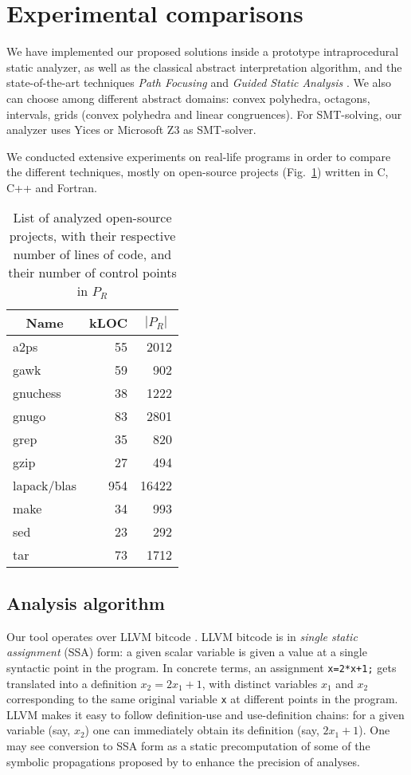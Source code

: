 \documentclass[preprint]{sigplanconf}
\begin{document}
\section{Experimental comparisons}
\label{sec:experiments}

We have implemented our proposed solutions inside a prototype intraprocedural
static analyzer,
as well as the classical abstract interpretation algorithm, and the state-of-the-art
techniques \emph{Path Focusing} \cite{Monniaux_Gonnord_SAS11} and \emph{Guided
Static Analysis} \cite{DBLP:conf/sas/GopanR07}.
We also can choose among different abstract domains: convex polyhedra, octagons,
intervals, grids (convex polyhedra and linear congruences).
For SMT-solving, our analyzer uses Yices
\cite{DBLP:conf/cav/DutertreM06} or Microsoft Z3\cite{DBLP:conf/tacas/MouraB08}
as SMT-solver.

We conducted extensive experiments on real-life programs in order to compare the
different techniques, mostly on open-source projects (Fig.~\ref{fig:projects}) written in C, C++ and Fortran.

\begin{table}[!h]
	\centering
\begin{tabular}{|l|r|r|} \hline
	\multicolumn{1}{|c|}{Name} &
        \multicolumn{1}{c|}{kLOC} &
        \multicolumn{1}{c|}{$|P_R|$} \\ \hline
	a2ps & 55 & 2012\\
	gawk & 59 & 902\\ 
	gnuchess & 38 & 1222\\ 
	gnugo & 83 & 2801\\
	grep & 35 & 820\\
	gzip & 27 & 494\\
	lapack/blas & 954 & 16422\\
	make & 34 & 993\\ 
	sed & 23 & 292\\
	tar & 73 & 1712\\
	\hline
\end{tabular}
\caption{List of analyzed open-source projects, with their respective number of
lines of code, and their number of control points in $P_R$}
\label{fig:projects}
\end{table}

\subsection{Analysis algorithm}
Our tool operates over LLVM bitcode \citep{LLVM_langref,Lattner:2004:LCF:977395.977673}. LLVM bitcode is in \emph{single static assignment} (SSA) form: a given scalar variable is given a value at a single syntactic point in the program. In concrete terms, an assignment \lstinline|x=2*x+1;| gets translated into a definition $x_2 = 2x_1+1$, with distinct variables $x_1$ and $x_2$ corresponding to the same original variable \lstinline|x| at different points in the program.
LLVM makes it easy to follow definition-use and use-definition chains: for a given variable (say, $x_2$) one can immediately obtain its definition (say, $2x_1+1$).
One may see conversion to SSA form as a static precomputation of some of the symbolic propagations proposed by \citet{DBLP:conf/vmcai/Mine06} to enhance the precision of analyses.
\end{document}
